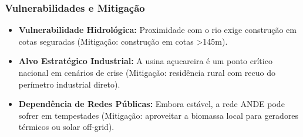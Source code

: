 \subsubsection{Vulnerabilidades e
Mitigação}

\begin{itemize}
\tightlist
\item
  \textbf{Vulnerabilidade Hidrológica:} Proximidade com o rio exige
  construção em cotas seguradas (Mitigação: construção em cotas
  \textgreater145m).
\item
  \textbf{Alvo Estratégico Industrial:} A usina açucareira é um ponto
  crítico nacional em cenários de crise (Mitigação: residência rural com
  recuo do perímetro industrial direto).
\item
  \textbf{Dependência de Redes Públicas:} Embora estável, a rede ANDE
  pode sofrer em tempestades (Mitigação: aproveitar a biomassa local
  para geradores térmicos ou solar off-grid).
\end{itemize}

